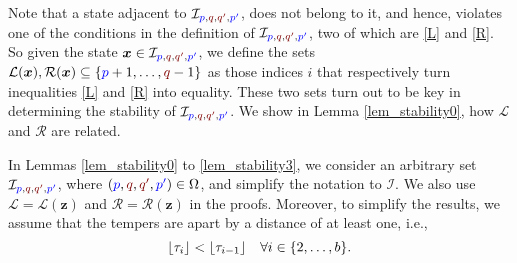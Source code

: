 \documentclass[10 pt,twocolumn,journal]{IEEEtran}
\DeclarePairedDelimiter{\floor}{\lfloor}{\rfloor}
\theoremstyle{plain}
\newcommand{\I}{\mathcal{I}}
\newcommand{\R}{\mathcal{R}}
\renewcommand{\L}{\mathcal{L}}
\newcommand{\x}{\bm{x}}
\newcommand{\z}{\bm{z}}
\newcommand{\p}{\tb{p}}
\newcommand{\pp}{\tb{p'}}
\newcommand{\q}{\tr{q}}
\newcommand{\qq}{\tr{q'}}
\newcommand{\tb}{\textcolor{blue}}
\newcommand{\tr}{\textcolor{Myred}}
\theoremstyle{definition}
\begin{document}
Note that a state adjacent to $\I_{\p,\q,\qq,\pp}$, does not belong to it, and hence, violates one of the conditions in the definition of $\I_{\p,\q,\qq,\pp}$, two of which are \eqref{L} and \eqref{R}.
So given the state $\x\in\I_{\p,\q,\qq,\pp}$, we define the sets $\L(\x),\R(\x)\subseteq\{\p+1,\ldots,\q-1\}$ as those indices $i$ that respectively turn inequalities \eqref{L} and \eqref{R} into equality.
These two sets turn out to be key in determining the stability of $\I_{\p,\q,\qq,\pp}$.
We show in Lemma \ref{lem_stability0}, how $\L$ and $\R$ are related. 


In Lemmas \ref{lem_stability0} to \ref{lem_stability3}, we consider an arbitrary set $\I_{\p,\q,\qq,\pp}$, where $(\p,\q,\qq,\pp)\in\Omega$, and simplify the notation to $\I$.
We also use $\L = \L(\z)$ and $\R = \R(\z)$ in the proofs.
Moreover, to simplify the results, we assume that the tempers are apart by a distance of at least one, i.e., 
\begin{equation}    \label{assumption_tauOrdering}
    \floor{\tau_i}<\floor{\tau_{i-1}}   \quad \forall i\in\{2,\ldots,b\}.
\end{equation}
\end{document}
